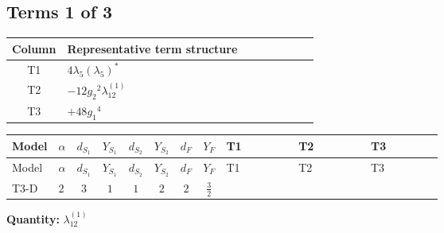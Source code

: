 \documentclass[8pt]{article}
\begin{document}
\begin{landscape}
\subsection*{Terms 1 of 3}
\begin{center}
\begin{tabular}{@{}c >{\raggedright\arraybackslash}p{0.82\linewidth}@{}}
\toprule
Column & Representative term structure \\
\midrule
T1 & \(\displaystyle 4 {\lambda_5} \left({\lambda_5}\right)^{*}\) \\
\midrule
T2 & \(\displaystyle -12 {g_2}^2 {\lambda_{12}^{(1)}}\) \\
\midrule
T3 & \(\displaystyle +48 {g_1}^4\) \\
\midrule
\bottomrule
\end{tabular}
\end{center}
\smallskip
\tiny
\begin{longtable}{@{}llcccccc >{\raggedright\arraybackslash}p{0.21\linewidth} >{\raggedright\arraybackslash}p{0.21\linewidth} >{\raggedright\arraybackslash}p{0.21\linewidth}@{}}
\toprule
Model & $\alpha$ & $d_{S_1}$ & $Y_{S_1}$ & $d_{S_2}$ & $Y_{S_2}$ & $d_F$ & $Y_F$ & T1 & T2 & T3 \\
\midrule
\endfirsthead
\toprule
Model & $\alpha$ & $d_{S_1}$ & $Y_{S_1}$ & $d_{S_2}$ & $Y_{S_2}$ & $d_F$ & $Y_F$ & T1 & T2 & T3 \\
\midrule
\endhead
T3-D & $2$ & $3$ & $1$ & $1$ & $2$ & $2$ & $\frac{3}{2}$ & \scriptsize\adjustbox{max width=\linewidth}{$\begin{gathered} 4 {\lambda_5} \left({\lambda_5}\right)^{*}\end{gathered}$} & \scriptsize\adjustbox{max width=\linewidth}{$\begin{gathered} -12 {g_2}^2 {\lambda_{12}^{(1)}}\end{gathered}$} & \scriptsize\adjustbox{max width=\linewidth}{$\begin{gathered} +48 {g_1}^4\end{gathered}$} \\
\midrule
\bottomrule
\end{longtable}
\clearpage
\noindent\textbf{Quantity: }$\lambda_{12}^{(1)}$\par\smallskip

\end{landscape}
\end{document}
